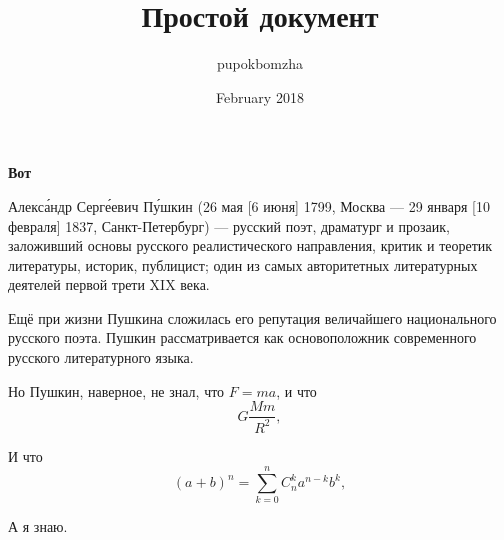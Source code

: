 \documentclass{article}
\title{Простой документ}
\author{pupokbomzha }
\date{February 2018}
\begin{document}
\begin{center}
    {\LARGE \bf  Вот}
\end{center}

Алекса́ндр Серге́евич Пу́шкин (26 мая [6 июня] 1799, Москва — 29 января [10 февраля] 1837, Санкт-Петербург) — русский поэт, драматург и прозаик, заложивший основы русского реалистического направления, критик и теоретик литературы, историк, публицист; один из самых авторитетных литературных деятелей первой трети XIX века.

Ещё при жизни Пушкина сложилась его репутация величайшего национального русского поэта.
Пушкин рассматривается как основоположник современного русского литературного языка.

Но Пушкин, наверное, не знал, что $F=ma$, и что
\[
  G \frac {Mm}{R^2} ,
\]

И что
\[
  (a+b)^n = \sum_{k=0}^n C^k_n a^{n-k} b^k,
\]

А я знаю.

\maketitle
\end{document}
